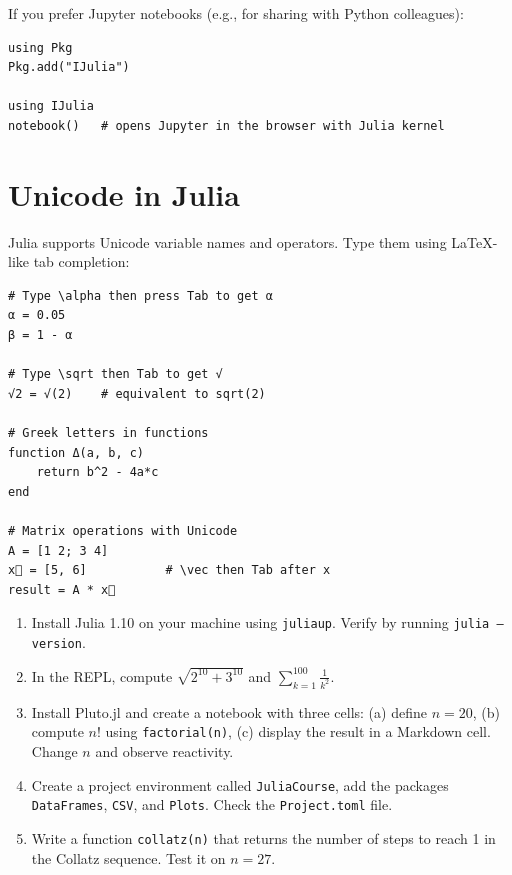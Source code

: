 If you prefer Jupyter notebooks (e.g., for sharing with Python colleagues):

\begin{verbatim}
using Pkg
Pkg.add("IJulia")

using IJulia
notebook()   # opens Jupyter in the browser with Julia kernel
\end{verbatim}

\section{Unicode in Julia}

Julia supports Unicode variable names and operators. Type them using LaTeX-like tab completion:

\begin{verbatim}
# Type \alpha then press Tab to get α
α = 0.05
β = 1 - α

# Type \sqrt then Tab to get √
√2 = √(2)    # equivalent to sqrt(2)

# Greek letters in functions
function Δ(a, b, c)
    return b^2 - 4a*c
end

# Matrix operations with Unicode
A = [1 2; 3 4]
x⃗ = [5, 6]           # \vec then Tab after x
result = A * x⃗
\end{verbatim}

\begin{exercise}
\begin{enumerate}
  \item Install Julia 1.10 on your machine using \texttt{juliaup}. Verify by running \texttt{julia --version}.
  \item In the REPL, compute $\sqrt{2^{10} + 3^{10}}$ and $\sum_{k=1}^{100} \frac{1}{k^2}$.
  \item Install Pluto.jl and create a notebook with three cells: (a) define $n = 20$, (b) compute $n!$ using \texttt{factorial(n)}, (c) display the result in a Markdown cell. Change $n$ and observe reactivity.
  \item Create a project environment called \texttt{JuliaCourse}, add the packages \texttt{DataFrames}, \texttt{CSV}, and \texttt{Plots}. Check the \texttt{Project.toml} file.
  \item Write a function \texttt{collatz(n)} that returns the number of steps to reach 1 in the Collatz sequence. Test it on $n = 27$.
\end{enumerate}
\end{exercise}

